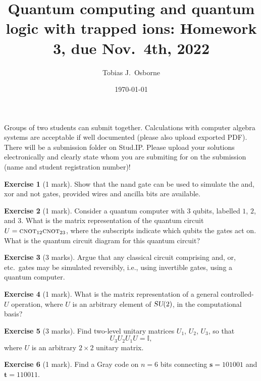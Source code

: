\documentclass[12pt,oneside]{amsart}
\title[Quantum computing and quantum logic with trapped ions]{Quantum computing and quantum logic with trapped ions: Homework 3, due Nov.\ 4th, 2022}
\author{Tobias J.\ Osborne}
\date{\today}                                           %
\theoremstyle{plain}%
\theoremstyle{definition}
\newtheorem{exercise}{\color{cgblue}Exercise}[section]
\theoremstyle{remark}
\begin{document}
\maketitle
Groups of two students can submit together. Calculations with computer algebra systems are acceptable if well documented (please also upload exported PDF). There will be a submission folder on Stud.IP. Please upload your solutions electronically and clearly state whom you are submiting for on the submission (name and student registration number)!

\setcounter{section}{1}

\begin{exercise}[1 mark]
   Show that the {\sc nand} gate can be used to simulate the {\sc and}, {\sc xor} and {\sc not} gates, provided wires and ancilla bits are available.
\end{exercise}

\begin{exercise}[1 mark]
  Consider a quantum computer with $3$ qubits, labelled $1$, $2$, and $3$. What is the matrix representation of the quantum circuit $U = \textsc{cnot}_{12}\textsc{cnot}_{23}$, where the subscripts indicate which qubits the gates act on. What is the quantum circuit diagram for this quantum circuit?
\end{exercise}

\begin{exercise}[3 marks]
  Argue that any classical circuit comprising {\sc and}, {\sc or}, etc.\ gates may be simulated reversibly, i.e., using invertible gates, using a quantum computer.
\end{exercise}

\begin{exercise}[1 mark]
  What is the matrix representation of a general controlled-$U$ operation, where $U$ is an arbitrary element of $\textsl{SU}(2)$, in the computational basis?
\end{exercise}

\begin{exercise}[3 marks]
  Find two-level unitary matrices $U_1$, $U_2$, $U_3$, so that
  \begin{equation}
    U_3 U_2 U_1 U = \mathbb{I},
  \end{equation}
  where $U$ is an arbitrary $2\times 2$ unitary matrix.
\end{exercise} 

\begin{exercise}[1 mark]
   Find a Gray code on $n=6$ bits connecting $\textbf{s} = 101001$ and $\textbf{t}=110011$.
\end{exercise}
\end{document}
